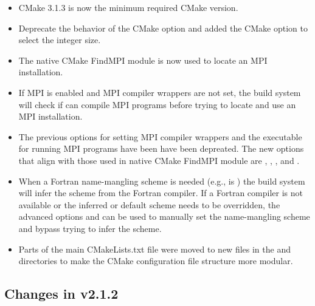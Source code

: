 \begin{itemize}
\item CMake 3.1.3 is now the minimum required CMake version.
\item Deprecate the behavior of the  CMake option and
  added the \newline 
   CMake option to select the 
  integer size.
\item The native CMake FindMPI module is now used to locate an MPI installation.
\item If MPI is enabled and MPI compiler wrappers are not set, the build system 
  will check if  can compile MPI programs before
  trying to locate and use an MPI installation.
\item The previous options for setting MPI compiler wrappers and the executable
  for running MPI programs have been have been depreated. The new options that
  align with those used in native CMake FindMPI module are
  , , ,
  and .
\item When a Fortran name-mangling scheme is needed (e.g., 
  is ) the build system will infer the scheme from the Fortran
  compiler. If a Fortran compiler is not available or the inferred or default
  scheme needs to be overridden, the advanced options
   and  can
  be used to manually set the name-mangling scheme and bypass trying to infer
  the scheme. 
\item Parts of the main CMakeLists.txt file were moved to new files in the
   and  directories to make the CMake configuration file
  structure more modular.
\end{itemize}

\subsection*{Changes in v2.1.2}

